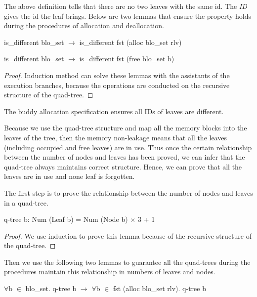 \documentclass[runningheads]{llncs}
\begin{document}
The above definition tells that there are no two leaves with the same id. The \textsl{ID} gives the id the leaf brings. Below are two lemmas that ensure the property holds during the procedures of allocation and deallocation.

\begin{lemma}
is\_different blo\_set $\longrightarrow$ is\_different fst (alloc blo\_set rlv)
\end{lemma}

\begin{lemma}
is\_different blo\_set $\longrightarrow$ is\_different fst (free blo\_set b)
\end{lemma}

\begin{proof}
Induction method can solve these lemmas with the assistants of the execution branches, because the operations are conducted on the recursive structure of the quad-tree.
\end{proof}

\begin{theorem}
The buddy allocation specification ensures all IDs of leaves are different.
\end{theorem}

Because we use the quad-tree structure and map all the memory blocks into the leaves of the tree, then the memory non-leakage means that all the leaves (including occupied and free leaves) are in use. Thus once the certain relationship between the number of nodes and leaves has been proved, we can infer that the quad-tree always maintains correct structure. Hence, we can prove that all the leaves are in use and none leaf is forgotten.

The first step is to prove the relationship between the number of nodes and leaves in a quad-tree.

\begin{lemma}
q-tree b: Num (Leaf b) = Num (Node b) $\times$ 3 + 1
\end{lemma}

\begin{proof}
We use induction  to prove this lemma because of the recursive structure of the quad-tree.
\end{proof}

Then we use the following two lemmas to guarantee all the quad-trees during the procedures maintain this relationship in numbers of leaves and nodes.

\begin{lemma}
$\forall$b $\in$ blo\_set. q-tree b $\longrightarrow$ $\forall$b $\in$ fst (alloc blo\_set rlv). q-tree b
\end{lemma}
\end{document}
